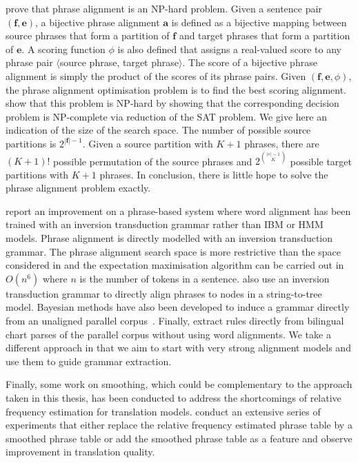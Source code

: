 \citet{denero-klein:2008:ACL} prove that phrase alignment is an
NP-hard problem. Given a sentence pair $(\bm{f}, \bm{e})$, a bijective phrase
alignment $\bm{a}$ is defined as a bijective mapping between source phrases that
form a partition of $\bm{f}$ and target phrases that form a partition of
$\bm{e}$. A scoring function $\phi$ is also defined that assigns a real-valued
score to any phrase pair $\langle$source phrase, target phrase$\rangle$. The score of a
bijective phrase alignment is simply the product of the scores of its phrase pairs.
Given $(\bm{f}, \bm{e}, \phi)$, the phrase alignment optimisation problem is to find
the best scoring alignment. \citet{denero-klein:2008:ACL} show that this problem
is NP-hard by showing that the corresponding decision problem is NP-complete via
reduction of the SAT problem. We give here an indication of the size of the search
space. The number of possible source partitions is $2^{|\bm{f}| - 1}$.
Given a source partition with $K + 1$ phrases, there are $(K + 1)!$ possible
permutation of the source phrases and $2^{{|e| - 1} \choose K}$ possible target
partitions with $K+1$ phrases. In conclusion, there is little hope to solve
the phrase alignment problem exactly.

\citet{saers-wu:2009:SSST} report an
improvement on a phrase-based system where word alignment has been trained with
an inversion transduction grammar rather than IBM or HMM models.
Phrase alignment is directly modelled with an inversion transduction
grammar. The phrase alignment search space is more restrictive than
the space considered in \citet{denero-klein:2008:ACL} and the
expectation maximisation algorithm can be carried out in $O(n^6)$
where $n$ is the number of tokens in a sentence.
\citet{pauls-klein-chiang-knight:2010:NAACL} also use an
inversion transduction grammar to directly align phrases to nodes in a
string-to-tree model. Bayesian methods have also been developed to induce a
grammar directly from an unaligned parallel
corpus~\citep{blunsom-cohn-osborne:2008:NIPS,blunsom-cohn-dyer-osborne:2009:ACL}.
Finally, \citet{Cmejrek2009} extract rules directly from
bilingual chart parses of the parallel corpus without using word alignments.
We take a different approach in that we aim to start with very strong alignment
models and use them to guide grammar extraction.

Finally, some work on smoothing, which could be complementary to the approach taken
in this thesis, has been conducted to address the
shortcomings of relative frequency estimation for translation models.
\citet{foster-kuhn-johnson:2006:EMNLP} conduct an extensive series of
experiments that either replace the relative frequency estimated phrase table by
a smoothed phrase table or add the smoothed phrase table as a feature and
observe improvement in translation quality.

